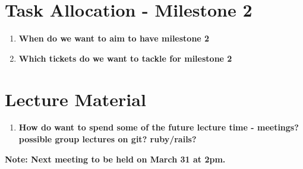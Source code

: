 \documentclass[10pt,english, a4paper]{article}
\begin{document}
\section{{Task Allocation - Milestone 2}}

\begin{enumerate}
\item \textbf{When do we want to aim to have milestone 2}{ \par}
\item \textbf{Which tickets do we want to tackle for milestone 2}{ \par}
\end{enumerate}

\section{{Lecture Material}}

\begin{enumerate}
\item \textbf{How do want to spend some of the future lecture time - meetings? possible group lectures on git? ruby/rails?}{\par}
\end{enumerate}

\vspace{20pt}
\textbf{Note: Next meeting to be held on March 31 at 2pm.}
\end{document}
